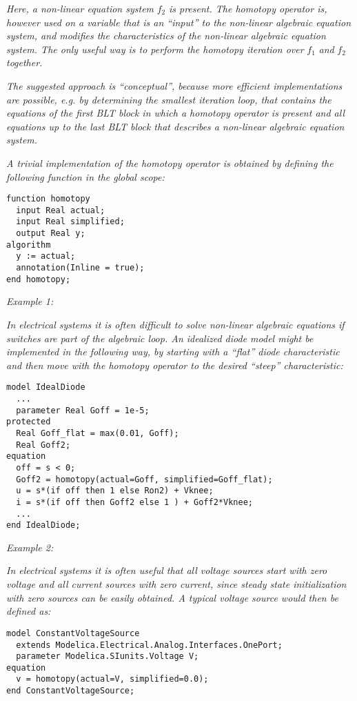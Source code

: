 \emph{Here, a non-linear equation system} $f_2$
\emph{is present. The homotopy operator is, however used on a variable
that is an ``input'' to the non-linear algebraic equation system, and
modifies the characteristics of the non-linear algebraic equation
system. The only useful way is to perform the homotopy iteration over}
$f_1$ \emph{and} $f_2$
\emph{together.}

\emph{The suggested approach is ``conceptual'', because more efficient
implementations are possible, e.g. by determining the smallest iteration
loop, that contains the equations of the first BLT block in which a
homotopy operator is present and all equations up to the last BLT block
that describes a non-linear algebraic equation system.}

\emph{A trivial implementation of the homotopy operator is obtained by
defining the following function in the global scope:}

\begin{lstlisting}[language=modelica]
function homotopy
  input Real actual;
  input Real simplified;
  output Real y;
algorithm
  y := actual;
  annotation(Inline = true);
end homotopy;
\end{lstlisting}

\emph{Example 1:}

\emph{In electrical systems it is often difficult to solve non-linear
algebraic equations if switches are part of the algebraic loop. An
idealized diode model might be implemented in the following way, by
starting with a ``flat'' diode characteristic and then move with the
homotopy operator to the desired ``steep'' characteristic:}

\begin{lstlisting}[language=modelica]
model IdealDiode
  ...
  parameter Real Goff = 1e-5;
protected
  Real Goff_flat = max(0.01, Goff);
  Real Goff2;
equation
  off = s < 0;
  Goff2 = homotopy(actual=Goff, simplified=Goff_flat);
  u = s*(if off then 1 else Ron2) + Vknee;
  i = s*(if off then Goff2 else 1 ) + Goff2*Vknee;
  ...
end IdealDiode;
\end{lstlisting}

\emph{Example 2:}

\emph{In electrical systems it is often useful that all voltage sources
start with zero voltage and all current sources with zero current, since
steady state initialization with zero sources can be easily obtained. A
typical voltage source would then be defined as:}

\begin{lstlisting}[language=modelica]
model ConstantVoltageSource
  extends Modelica.Electrical.Analog.Interfaces.OnePort; 
  parameter Modelica.SIunits.Voltage V;
equation
  v = homotopy(actual=V, simplified=0.0);
end ConstantVoltageSource;
\end{lstlisting}

